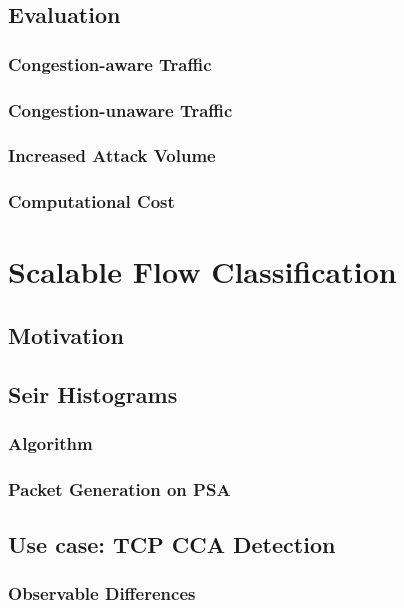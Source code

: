 \documentclass[twoside,hidelinks]{glasgowthesis}
\begin{document}
\section{Evaluation}
\subsection{Congestion-aware Traffic}
\subsection{Congestion-unaware Traffic}
\subsection{Increased Attack Volume}
\subsection{Computational Cost}





\chapter{Scalable Flow Classification}\label{chap:seidr}
\section{Motivation}
\section{Sei\dh{}r Histograms}
\subsection{Algorithm}
\subsection{Packet Generation on PSA}
\section{Use case: TCP CCA Detection}
\subsection{Observable Differences}
\end{document}
